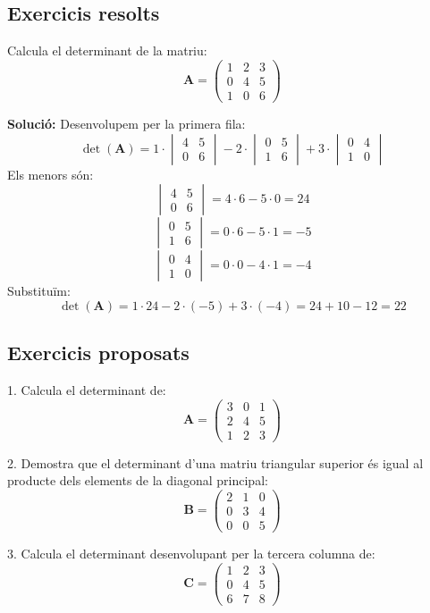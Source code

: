 \documentclass[12pt]{article}
\newcommand{\mat}[1]{\mathbf{#1}}
\begin{document}
\subsection*{Exercicis resolts}
\begin{exercici}
Calcula el determinant de la matriu:
\[
\mat{A} = \begin{pmatrix}
1 & 2 & 3 \\
0 & 4 & 5 \\
1 & 0 & 6
\end{pmatrix}
\]

\textbf{Solució:} Desenvolupem per la primera fila:
\[
\det(\mat{A}) = 1 \cdot \begin{vmatrix}
4 & 5 \\
0 & 6
\end{vmatrix} - 2 \cdot \begin{vmatrix}
0 & 5 \\
1 & 6
\end{vmatrix} + 3 \cdot \begin{vmatrix}
0 & 4 \\
1 & 0
\end{vmatrix}
\]
Els menors són:
\[
\begin{vmatrix}
4 & 5 \\
0 & 6
\end{vmatrix} = 4\cdot6 - 5\cdot0 = 24
\]
\[
\begin{vmatrix}
0 & 5 \\
1 & 6
\end{vmatrix} = 0\cdot6 - 5\cdot1 = -5
\]
\[
\begin{vmatrix}
0 & 4 \\
1 & 0
\end{vmatrix} = 0\cdot0 - 4\cdot1 = -4
\]
Substituïm:
\[
\det(\mat{A}) = 1\cdot24 - 2\cdot(-5) + 3\cdot(-4) = 24 + 10 - 12 = 22
\]
\end{exercici}

\subsection*{Exercicis proposats}
\begin{exercici}
1. Calcula el determinant de:
\[
\mat{A} = \begin{pmatrix}
3 & 0 & 1 \\
2 & 4 & 5 \\
1 & 2 & 3
\end{pmatrix}
\]

2. Demostra que el determinant d'una matriu triangular superior és igual al producte dels elements de la diagonal principal:
\[
\mat{B} = \begin{pmatrix}
2 & 1 & 0 \\
0 & 3 & 4 \\
0 & 0 & 5
\end{pmatrix}
\]

3. Calcula el determinant desenvolupant per la tercera columna de:
\[
\mat{C} = \begin{pmatrix}
1 & 2 & 3 \\
0 & 4 & 5 \\
6 & 7 & 8
\end{pmatrix}
\]
\end{exercici}
\end{document}

